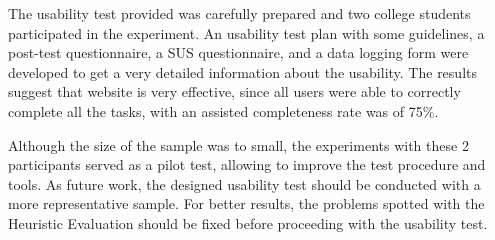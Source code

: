 \documentclass[a4paper]{article}
\begin{document}
The usability test provided was carefully prepared and two college students participated in the experiment.
An usability test plan with some guidelines, a post-test questionnaire, a SUS questionnaire, and a data logging form were developed to get a very detailed information about the usability.
The results suggest that website is very effective, since all users were able to correctly complete all the tasks, with an assisted completeness rate was of 75\%. 


Although the size of the sample was to small, the experiments with these 2 participants served as a pilot test, allowing to improve the test procedure and tools. As future work, the designed usability test should be conducted with a more representative sample. For better results, the problems spotted with the Heuristic Evaluation should be fixed before proceeding with the usability test.

\appendix












\end{document}
